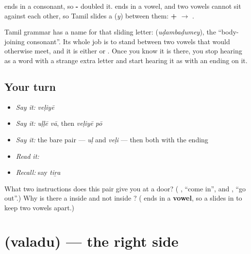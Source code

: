 \begin{culture}
\textbf{} ends in a consonant, so \textbf{-} doubled it. \textbf{} ends in a vowel, and two vowels cannot sit against each other, so Tamil slides a \textbf{} (\emph{y}) between them: \textbf{ +  $\to$ }.

Tamil grammar has a name for that sliding letter: \textbf{} (\emph{uḍambaḍumey}), the \textquotedblleft{}body-joining consonant\textquotedblright{}. Its whole job is to stand between two vowels that would otherwise meet, and it is either \textbf{} or \textbf{}. Once you know it is there, you stop hearing \textbf{} as a word with a strange extra letter and start hearing it as \textbf{} with an ending on it.
\end{culture}

\subsection*{Your turn}
\begin{itemize}
\raggedright
  \item \emph{Say it:} \emph{veḷiyē}
  \item \emph{Say it:} \emph{uḷḷē vā}, then \emph{veḷiyē pō}
  \item \emph{Say it:} the bare pair — \emph{uḷ} and \emph{veḷi} — then both with the ending
  \item \emph{Read it:} \textbf{}
  \item \emph{Recall:} say \emph{tiṟa}
\end{itemize}

\begin{tcolorbox}[breakable,colback=teal!4,colframe=teal!35!black,title={Before you move on}]
What two instructions does this pair give you at a door? (\textbf{ }, \textquotedblleft{}come in\textquotedblright{}, and \textbf{ }, \textquotedblleft{}go out\textquotedblright{}.) Why is there a \textbf{} inside  and not inside ? (\textbf{} ends in a \textbf{vowel}, so a \textbf{} slides in to keep two vowels apart.)
\end{tcolorbox}
\section[\texorpdfstring{\ta{வலது} (valadu)}{வலது (valadu)}]{ (valadu) — the right side}

